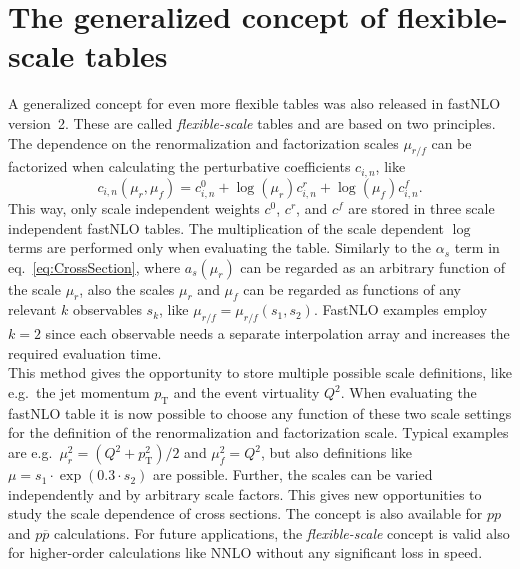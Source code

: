 \documentclass{DISproc}
\begin{document}


\section{The generalized concept of flexible-scale tables}

A generalized concept for even more flexible tables was also released
in fastNLO version~2.
These are called \emph{flexible-scale} tables and are based on two principles.\\
The dependence on the renormalization and factorization scales
$\mu_{r/f}$ can be factorized when calculating the
perturbative coefficients $c_{i,n}$, like
\begin{equation}\label{eq:ScaleIndependentWeights}
  c_{i,n}(\mu_r,\mu_f) = c_{i,n}^0 + \log(\mu_r)c_{i,n}^r +  \log(\mu_f) c_{i,n}^f.
\end{equation}
This way, only scale independent weights $c^0$, $c^r$, and $c^f$ are
stored in three scale independent fastNLO tables.  The multiplication
of the scale dependent $\log$ terms are performed only when evaluating
the table.  Similarly to the $\alpha_s$ term in eq.\
\ref{eq:CrossSection}, where $a_s(\mu_r)$ can be regarded as an
arbitrary function of the scale $\mu_r$, also the scales $\mu_r$ and
$\mu_f$ can be regarded as functions of any relevant $k$ observables
$s_k$, like $\mu_{r/f} = \mu_{r/f}(s_1,s_2)$.
FastNLO examples employ $k=2$ since each observable needs a separate
interpolation array and increases the required evaluation time.\\
This method gives the opportunity to store multiple possible scale
definitions, like e.g.\ the jet momentum $p_\mathrm{T}$ and the event
virtuality $Q^2$.  When evaluating the fastNLO table it is now
possible to choose any function of these two scale settings for the
definition of the renormalization and factorization scale. Typical
examples are e.g.\ $\mu_r^2 = (Q^2+p^2_\mathrm{T})/2$ and $\mu_f^2 =
Q^2$, but also definitions like $\mu = s_1 \cdot \exp(0.3 \cdot s_2)$
are possible.  Further, the scales can be varied independently and by
arbitrary scale factors.  This gives new opportunities to study the
scale dependence of cross sections.  The concept is also available for
$pp$ and $p\overline{p}$ calculations.  For future applications, the
\emph{flexible-scale} concept is valid also for higher-order
calculations like NNLO without any significant loss in speed.
\end{document}
